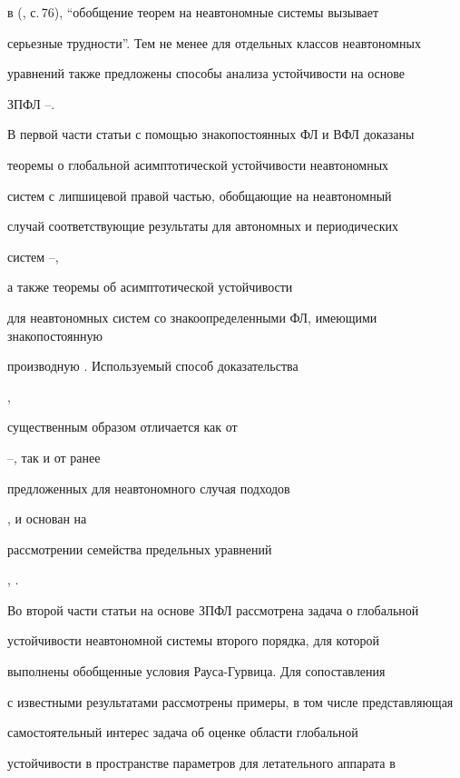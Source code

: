 в (\cite{Bul2}, с.\,76), ``обобщение теорем на неавтономные системы вызывает 


серьезные трудности''. Тем не менее для отдельных классов неавтономных 


уравнений также предложены способы анализа устойчивости на основе 


ЗПФЛ \cite{M2}--\cite{Kos2}. 


 


В первой части статьи с помощью знакопостоянных ФЛ и ВФЛ доказаны 


теоремы о глобальной асимптотической устойчивости неавтономных 


систем с липшицевой правой частью, обобщающие на неавтономный 


случай соответствующие результаты для автономных и периодических 


систем \cite{Sam}--\cite{Bul2}, 


а также теоремы об асимптотической устойчивости 


для неавтономных систем со знакоопределенными ФЛ, имеющими знакопостоянную 


производную \cite{And}. Используемый способ доказательства 


\cite{Kos1}, \cite{Kos2} 


существенным образом отличается как от 


\cite{Sam}--\cite{Bul2}, так и от ранее 


предложенных для неавтономного случая подходов 


\cite{M2}, \cite{Kol1} и основан на 


рассмотрении семейства предельных уравнений 


\cite{Art1}, \cite{Art2}. 


 


Во второй части статьи на основе ЗПФЛ рассмотрена задача о глобальной 


устойчивости неавтономной системы второго порядка, для которой 


выполнены обобщенные условия Рауса-Гурвица. Для сопоставления 


с известными результатами рассмотрены примеры, в том числе представляющая 


самостоятельный интерес задача об оценке области глобальной 


устойчивости в пространстве параметров для летательного аппарата в 


